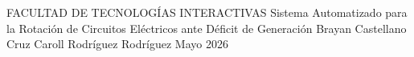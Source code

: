 \portadaUCI
  {FACULTAD DE TECNOLOGÍAS INTERACTIVAS}
  {Sistema Automatizado para la Rotación de Circuitos Eléctricos ante Déficit de Generación}
  {Brayan Castellano Cruz}
  {Caroll Rodríguez Rodríguez}
  {}     %
  {}  %
  {}       %
  {Mayo}
  {2026}
